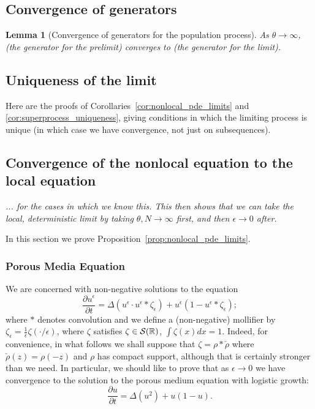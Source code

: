 \documentclass[12pt]{article}
\newtheorem{lemma}[theorem]{Lemma}
\newcommand{\IR}{\mathbb R}
\newcommand{\plr}[1]{\todo[inline]{Peter: #1}}
\newcommand{\comment}[1]{{\color{blue} \it #1}}
\begin{document}
\subsection{Convergence of generators}
    \label{sec:population_generators_proofs}

    \begin{lemma}[Convergence of generators for the population process]
        As $\theta \to \infty$,
        \comment{(the generator for the prelimit)}
        converges to
        \comment{(the generator for the limit)}.
    \end{lemma}

\subsection{Uniqueness of the limit}
    \label{sec:uniqueness_proofs}

Here are the proofs of Corollaries~\ref{cor:nonlocal_pde_limits}
and \ref{cor:superprocess_uniqueness},
giving conditions in which the limiting process is unique
(in which case we have convergence, not just on subsequences).


\subsection{Convergence of the nonlocal equation to the local equation}

\comment{... for the cases in which we know this.
This then shows that we can take the local, deterministic limit
by taking $\theta, N \to \infty$ first, and then $\epsilon \to 0$ after.
}

In this section we prove Proposition~\ref{prop:nonlocal_pde_limits}.

\subsubsection{Porous Media Equation}

\plr{This is from pme.tex.}

We are concerned with non-negative solutions to the equation
\begin{equation}
\label{mollified equation}
\frac{\partial u^\epsilon}{\partial t}=
\Delta\left(u^\epsilon \cdot u^\epsilon *\zeta_\epsilon\right)
+u^\epsilon\left(1-u^\epsilon*\zeta_\epsilon\right);
\end{equation}
where $*$ denotes convolution and we define
a (non-negative) mollifier by
$\zeta_\epsilon=\frac{1}{\epsilon}\zeta(\cdot/\epsilon)$, where $\zeta$
satisfies
$\zeta\in\cal{S}(\IR)$, $\int\zeta(x)dx=1$. Indeed, for convenience, in
what follows we shall suppose that $\zeta =\rho*\check{\rho}$ where
$\check{\rho}(z)=\rho(-z)$ and $\rho$ has
compact support, although that
is certainly stronger than we need.
In particular, we should like to prove that as $\epsilon\to 0$ we have
convergence to the solution to the porous medium equation with
logistic growth:
\begin{equation}
\label{PME}
\frac{\partial u}{\partial t}=
\Delta\left(u^2\right)
+u\left(1-u\right).
\end{equation}
\end{document}
